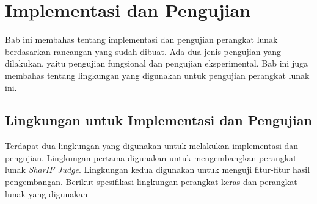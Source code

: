 \chapter{Implementasi dan Pengujian}
\label{chap:implementasi dan pengujian}

Bab ini membahas tentang implementasi dan pengujian perangkat lunak berdasarkan rancangan yang sudah dibuat. Ada dua jenis pengujian yang dilakukan, yaitu pengujian fungsional dan pengujian eksperimental. Bab ini juga membahas tentang lingkungan yang digunakan untuk pengujian perangkat lunak ini.

\section{Lingkungan untuk Implementasi dan Pengujian}
Terdapat dua lingkungan yang digunakan untuk melakukan implementasi dan pengujian. Lingkungan pertama digunakan untuk mengembangkan perangkat lunak \textit{SharIF Judge}. Lingkungan kedua digunakan untuk menguji fitur-fitur hasil pengembangan. Berikut spesifikasi lingkungan perangkat keras dan perangkat lunak yang digunakan 
